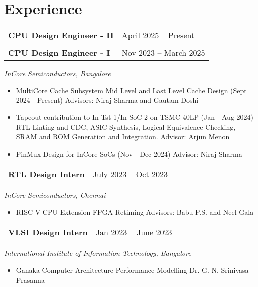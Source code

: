 \section{\sc Experience}


\begin{tabular}{@{}p{4in}p{2in}}
    {\bf{CPU Design Engineer - II}}  & April 2025 – Present \\ \\
    {\bf{CPU Design Engineer - I}}  & Nov 2023 – March 2025 \\
  \end{tabular}  
  \textit{InCore Semiconductors, Bangalore} 
  \vspace{0.4em}
  \begin{itemize}
    \setlength\itemsep{0em}
    \item MultiCore Cache Subsystem 
      \subitem Mid Level and Last Level Cache Design (Sept 2024 - Present)
      \subitem Advisors: Niraj Sharma and Gautam Doshi     
    \item Tapeout contribution to In-Tst-1/In-SoC-2 on TSMC 40LP (Jan - Aug 2024)
      \subitem RTL Linting and CDC, ASIC Synthesis, Logical Equivalence Checking, 
      \subitem SRAM and ROM Generation and Integration.
      \subitem Advisor: Arjun Menon
    \item PinMux Design for InCore SoCs (Nov - Dec 2024)
      \subitem Advisor: Niraj Sharma       
\end{itemize}

\begin{tabular}{@{}p{4in}p{2in}}
  {\bf{RTL Design Intern}}  & July 2023 – Oct 2023 \\
\end{tabular}  
\textit{InCore Semiconductors, Chennai} 
\begin{itemize}
    \setlength\itemsep{0em}
  \item RISC-V CPU Extension FPGA Retiming
    \subitem Advisors: Babu P.S. and Neel Gala  
\end{itemize}

\begin{tabular}{@{}p{4in}p{2in}}
  {\bf{VLSI Design Intern}} & Jan 2023 – June 2023 \\
\end{tabular}
\textit{International Institute of Information Technology, Bangalore}  
\begin{itemize}
    \setlength\itemsep{0em}
  \item Ganaka Computer Architecture Performance Modelling 
    \subitem Dr. G. N. Srinivasa Prasanna 
\end{itemize}

